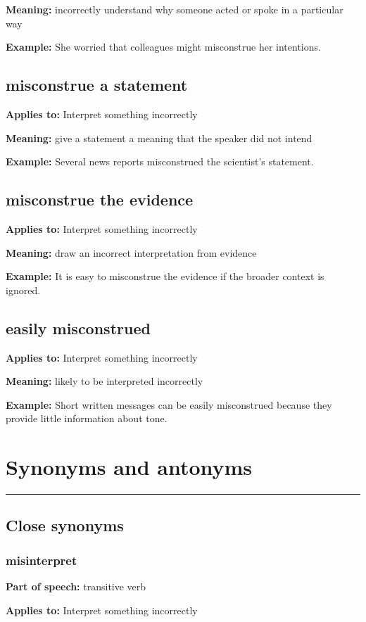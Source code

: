 \documentclass[11pt]{article}
\newcommand{\sectionrule}{\par\vspace{-0.5em}\noindent\textcolor{Accent}{\rule{\linewidth}{0.6pt}}\par}
\begin{document}
\textbf{Meaning:} incorrectly understand why someone acted or spoke in a particular way

\textbf{Example:} She worried that colleagues might misconstrue her intentions.

\subsection{misconstrue a statement}
\textbf{Applies to:} Interpret something incorrectly

\textbf{Meaning:} give a statement a meaning that the speaker did not intend

\textbf{Example:} Several news reports misconstrued the scientist's statement.

\subsection{misconstrue the evidence}
\textbf{Applies to:} Interpret something incorrectly

\textbf{Meaning:} draw an incorrect interpretation from evidence

\textbf{Example:} It is easy to misconstrue the evidence if the broader context is ignored.

\subsection{easily misconstrued}
\textbf{Applies to:} Interpret something incorrectly

\textbf{Meaning:} likely to be interpreted incorrectly

\textbf{Example:} Short written messages can be easily misconstrued because they provide little information about tone.

\section{Synonyms and antonyms}
\sectionrule
\subsection{Close synonyms}
\subsubsection{misinterpret}
\textbf{Part of speech:} transitive verb

\textbf{Applies to:} Interpret something incorrectly
\end{document}
